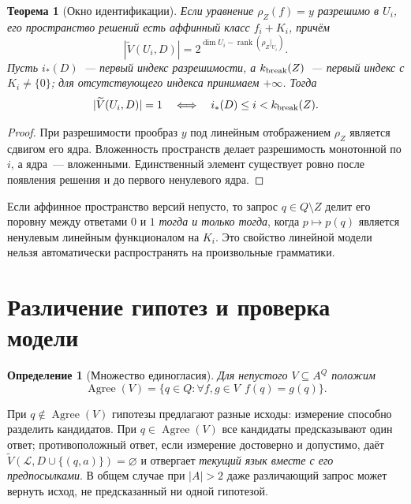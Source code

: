 \documentclass[11pt,a4paper]{article}
\newtheorem{definition}{Определение}[section]
\newtheorem{theorem}{Теорема}[section]
\newcommand{\VS}{\widetilde V}
\newcommand{\Agree}{\operatorname{Agree}}
\begin{document}
\begin{theorem}[Окно идентификации]\label{thm:window}
Если уравнение $\rho_Z(f)=y$ разрешимо в $U_i$, его пространство решений есть аффинный класс $f_i+K_i$, причём
\begin{equation}\label{eq:affine}
|\VS(U_i,D)|=2^{\dim U_i-\operatorname{rank}(\rho_Z|_{U_i})}.
\end{equation}
Пусть $i_*(D)$~--- первый индекс разрешимости, а $k_{\rm break}(Z)$~--- первый индекс с $K_i\ne\{0\}$; для отсутствующего индекса принимаем $+\infty$. Тогда
\begin{equation}\label{eq:window}
|\VS(U_i,D)|=1\quad\Longleftrightarrow\quad i_*(D)\le i<k_{\rm break}(Z).
\end{equation}
\end{theorem}
\begin{proof}
При разрешимости прообраз $y$ под линейным отображением $\rho_Z$ является сдвигом его ядра. Вложенность пространств делает разрешимость монотонной по $i$, а ядра~--- вложенными. Единственный элемент существует ровно после появления решения и до первого ненулевого ядра.
\end{proof}

Если аффинное пространство версий непусто, то запрос $q\in Q\setminus Z$ делит его поровну между ответами $0$ и $1$ \emph{тогда и только тогда}, когда $p\mapsto p(q)$ является ненулевым линейным функционалом на $K_i$. Это свойство линейной модели нельзя автоматически распространять на произвольные грамматики.

\section{Различение гипотез и проверка модели}

\begin{definition}[Множество единогласия]
Для \emph{непустого} $V\subseteq A^Q$ положим
\begin{equation}\label{eq:agree}
\Agree(V)=\{q\in Q:\forall f,g\in V\ \ f(q)=g(q)\}.
\end{equation}
\end{definition}

При $q\notin\Agree(V)$ гипотезы предлагают разные исходы: измерение способно разделить кандидатов. При $q\in\Agree(V)$ все кандидаты предсказывают один ответ; противоположный ответ, если измерение достоверно и допустимо, даёт $\VS(\mathcal L,D\cup\{(q,a)\})=\varnothing$ и отвергает \emph{текущий язык вместе с его предпосылками}. В общем случае при $|A|>2$ даже различающий запрос может вернуть исход, не предсказанный ни одной гипотезой.
\end{document}

